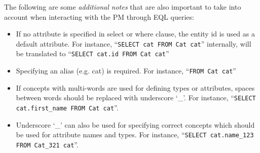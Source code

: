 The following are some \emph{additional notes} that are also important to take into account when interacting with the PM through EQL queries:
\begin{itemize}
\item If no attribute is specified in select or where clause, the entity id is used as a default attribute. For instance, 
``\texttt{SELECT cat FROM Cat cat}'' internally, will be translated to ``\texttt{SELECT cat.id FROM Cat cat}''

\item Specifying an alias (e.g. cat) is required. For instance, ``\texttt{FROM Cat cat}''

\item If concepts with multi-words are used for defining types or attributes, spaces between words should be replaced with underscore `\_'. For instance, ``\texttt{SELECT cat.first\_name FROM Cat cat}''.

\item Underscore `\_' can also be used for specifying correct concepts which should be used for attribute names and types. For instance, ``\texttt{SELECT cat.name\_123 FROM Cat\_321 cat}''.
\end{itemize}



%












